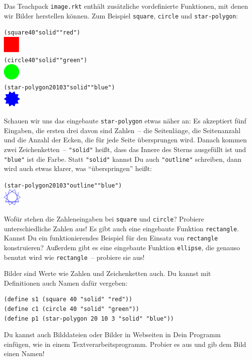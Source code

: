 Das Teachpack \texttt{image.rkt} enthält zusätzliche vordefinierte
Funktionen, mit denen wir Bilder herstellen können.  Zum Beispiel
\texttt{square}, \texttt{circle} und \texttt{star-polygon}:
%
\begin{alltt}
(square 40 "solid" "red")
\evalsto{} \includegraphics[height=24pt]{i1prog/square}
(circle 40 "solid" "green")
\evalsto{} \includegraphics[height=24pt]{i1prog/circle}
(star-polygon 20 10 3 "solid" "blue")
\evalsto{} \includegraphics[height=24pt]{i1prog/starpolygon}
\end{alltt}
%
Schauen wir uns das eingebaute \texttt{star-polygon} etwas näher an:
Es akzeptiert fünf Eingaben, die ersten drei davon sind Zahlen~-- die
Seitenlänge, die Seitenanzahl und die Anzahl der Ecken, die für jede
Seite übersprungen wird.  Danach kommen zwei Zeichenketten~--
\verb|"solid"| heißt, dass das Innere des Sterns ausgefüllt ist und
\verb|"blue"| ist die Farbe.  Statt \verb|"solid"| kannst Du auch
\verb|"outline"| schreiben, dann wird auch etwas klarer, was
"`überspringen"' heißt:
%
\begin{alltt}
(star-polygon 20 10 3 "outline" "blue")
\evalsto{} \includegraphics[height=24pt]{i1prog/starpolygon_outline}
\end{alltt}
%
\begin{aufgabe}
  Wofür stehen die Zahleneingaben bei \texttt{square} und
  \texttt{circle}?  Probiere unterschiedliche Zahlen aus!  Es gibt
  auch eine eingebaute Funktion \texttt{rectangle}.  Kannst Du ein
  funktionierendes Beispiel für den Einsatz von \texttt{rectangle}
  konstruieren?  Außerdem gibt es eine eingebaute Funktion
  \texttt{ellipse}, die genauso benutzt wird wie \texttt{rectangle}~--
  probiere sie aus!
\end{aufgabe}
%
Bilder sind Werte wie Zahlen und Zeichenketten auch.  Du kannst
mit Definitionen auch Namen dafür vergeben:
%
\begin{verbatim}
(define s1 (square 40 "solid" "red"))
(define c1 (circle 40 "solid" "green"))
(define p1 (star-polygon 20 10 3 "solid" "blue"))
\end{verbatim}
%
\begin{aufgabe}
  Du kannst auch Bilddateien oder Bilder in Webseiten in Dein Programm
  einfügen, wie in einem Textverarbeitsprogramm.  Probier es aus und
  gib dem Bild einen Namen!
\end{aufgabe}

